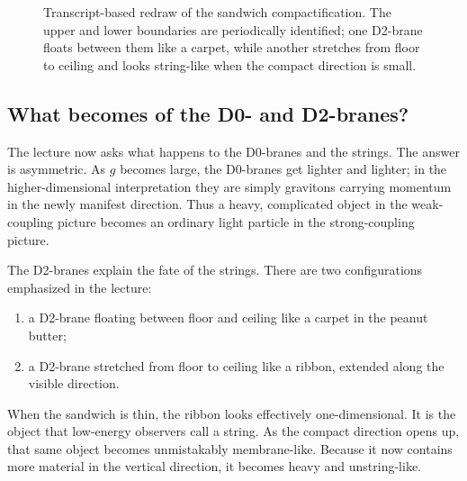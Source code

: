 \begin{figure}[h]
\centering
{}%
\caption{Transcript-based redraw of the sandwich compactification. The upper and lower boundaries are periodically identified; one D2-brane floats between them like a carpet, while another stretches from floor to ceiling and looks string-like when the compact direction is small.}
\end{figure}

\subsection{What becomes of the D0- and D2-branes?}

The lecture now asks what happens to the D0-branes and the strings. The answer is asymmetric. As \(g\) becomes large, the D0-branes get lighter and lighter; in the higher-dimensional interpretation they are simply gravitons carrying momentum in the newly manifest direction. Thus a heavy, complicated object in the weak-coupling picture becomes an ordinary light particle in the strong-coupling picture.

The D2-branes explain the fate of the strings. There are two configurations emphasized in the lecture:
\begin{enumerate}
\item a D2-brane floating between floor and ceiling like a carpet in the peanut butter;
\item a D2-brane stretched from floor to ceiling like a ribbon, extended along the visible direction.
\end{enumerate}
When the sandwich is thin, the ribbon looks effectively one-dimensional. It is the object that low-energy observers call a string. As the compact direction opens up, that same object becomes unmistakably membrane-like. Because it now contains more material in the vertical direction, it becomes heavy and unstring-like.

